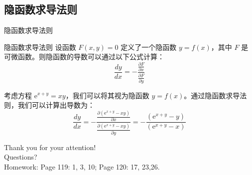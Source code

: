 \documentclass[
10pt,
aspectratio=43,
]{beamer}
\begin{document}
\subsection{隐函数求导法则}
\begin{frame}{隐函数求导法则}
	\begin{block}{隐函数求导法则}
		设函数 $F(x, y) = 0$ 定义了一个隐函数 $y = f(x)$，其中 $F$ 是可微函数。则隐函数的导数可以通过以下公式计算：
		\[
			\displaystyle\frac{{dy}}{{dx}} = -\frac{{\frac{{\partial F}}{{\partial x}}}}{{\frac{{\partial F}}{{\partial y}}}}
		\]
	\end{block}

	\pause

	\begin{example}
		考虑方程 $\mathrm{e}^{x+y}=xy$，我们可以将其视为隐函数 $y = f(x)$。通过隐函数求导法则，我们可以计算出导数为：
		\[
			\displaystyle\frac{{dy}}{{dx}} = -\displaystyle\frac{{\displaystyle\frac{{\partial (\mathrm{e}^{x+y}-xy)}}{{\partial x}}}}{{\displaystyle\frac{{\partial (\mathrm{e}^{x+y}-xy)}}{{\partial y}}}} = -\frac{{(\mathrm{e}^{x+y}-y)}}{{(\mathrm{e}^{x+y}-x)}}
		\]
	\end{example}
\end{frame}


\begin{frame}[plain]
	\vfill
	\centering
	{
		\centering \Huge \color{white} Thank you for your attention!\\[10pt]Questions?\\\bigskip
		Homework: Page 119: 1, 3, 10; Page 120: 17, 23,26.
	}
	\vfill
\end{frame}
\end{document}
